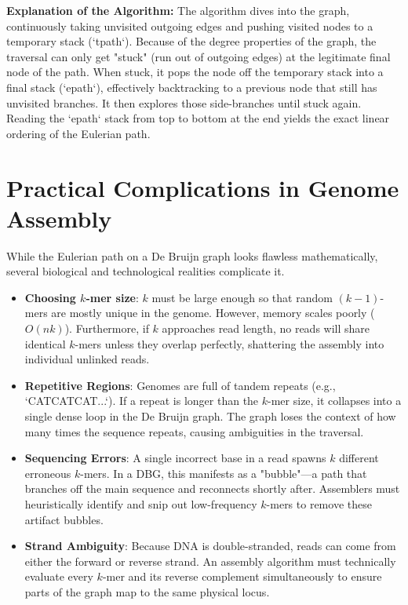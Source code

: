 \documentclass[11pt, a4paper]{article}
\begin{document}
\textbf{Explanation of the Algorithm:} 
The algorithm dives into the graph, continuously taking unvisited outgoing edges and pushing visited nodes to a temporary stack (`tpath`). Because of the degree properties of the graph, the traversal can only get "stuck" (run out of outgoing edges) at the legitimate final node of the path. When stuck, it pops the node off the temporary stack into a final stack (`epath`), effectively backtracking to a previous node that still has unvisited branches. It then explores those side-branches until stuck again. Reading the `epath` stack from top to bottom at the end yields the exact linear ordering of the Eulerian path.

\section{Practical Complications in Genome Assembly}
While the Eulerian path on a De Bruijn graph looks flawless mathematically, several biological and technological realities complicate it.

\begin{itemize}
    \item \textbf{Choosing $k$-mer size}: $k$ must be large enough so that random $(k-1)$-mers are mostly unique in the genome. However, memory scales poorly ($O(nk)$). Furthermore, if $k$ approaches read length, no reads will share identical $k$-mers unless they overlap perfectly, shattering the assembly into individual unlinked reads.
    \item \textbf{Repetitive Regions}: Genomes are full of tandem repeats (e.g., `CATCATCAT...`). If a repeat is longer than the $k$-mer size, it collapses into a single dense loop in the De Bruijn graph. The graph loses the context of how many times the sequence repeats, causing ambiguities in the traversal.
    \item \textbf{Sequencing Errors}: A single incorrect base in a read spawns $k$ different erroneous $k$-mers. In a DBG, this manifests as a "bubble"—a path that branches off the main sequence and reconnects shortly after. Assemblers must heuristically identify and snip out low-frequency $k$-mers to remove these artifact bubbles.
    \item \textbf{Strand Ambiguity}: Because DNA is double-stranded, reads can come from either the forward or reverse strand. An assembly algorithm must technically evaluate every $k$-mer and its reverse complement simultaneously to ensure parts of the graph map to the same physical locus.
\end{itemize}
\end{document}
